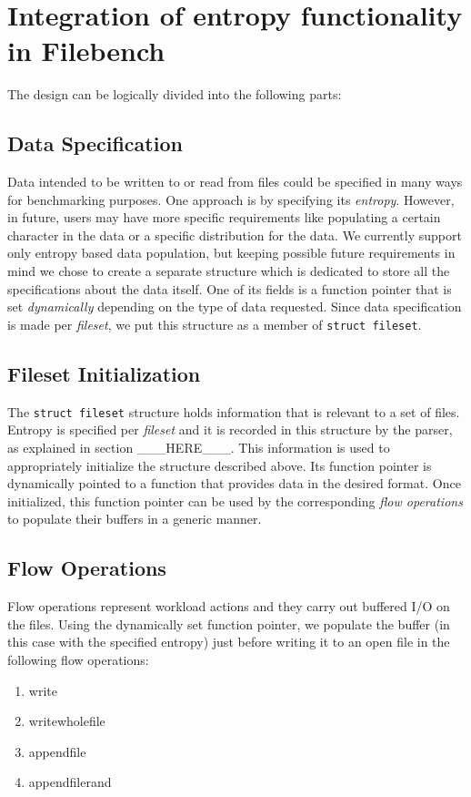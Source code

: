 \documentclass{article}
\begin{document}
\section{Integration of entropy functionality in Filebench}
The design can be logically divided into the following parts:

\subsection{Data Specification}
Data intended to be written to or read from files could be specified in many ways for benchmarking purposes. One approach is by specifying its \textit{entropy}. However, in future, users may have more specific requirements like populating a certain character in the data or a specific distribution for the data. We currently support only entropy based data population, but keeping possible future requirements in mind we chose to create a separate structure which is dedicated to store all the specifications about the data itself. One of its fields is a function pointer that is set \textit{dynamically} depending on the type of data  requested. Since data specification is made per \textit{fileset}, we put this structure as a member of \texttt{struct fileset}.

\subsection{Fileset Initialization}
The \texttt{struct fileset} structure holds information that is relevant to a set of files. Entropy is specified per \textit{fileset} and it is recorded in this structure by the parser, as explained in section \_\_\_HERE\_\_\_. This information is used to appropriately initialize the structure described above. Its function pointer is dynamically pointed to a function that provides data in the desired format. Once initialized, this function pointer can be used by the corresponding \textit{flow operations} to populate their buffers in a generic manner.

\subsection{Flow Operations}
Flow operations represent workload actions and they carry out buffered I/O on the files. Using the dynamically set function pointer, we populate the buffer (in this case with the specified entropy) just before writing it to an open file in the following flow operations:
\begin{enumerate}
\item write
\item writewholefile
\item appendfile
\item appendfilerand
\end{enumerate}
\end{document}
